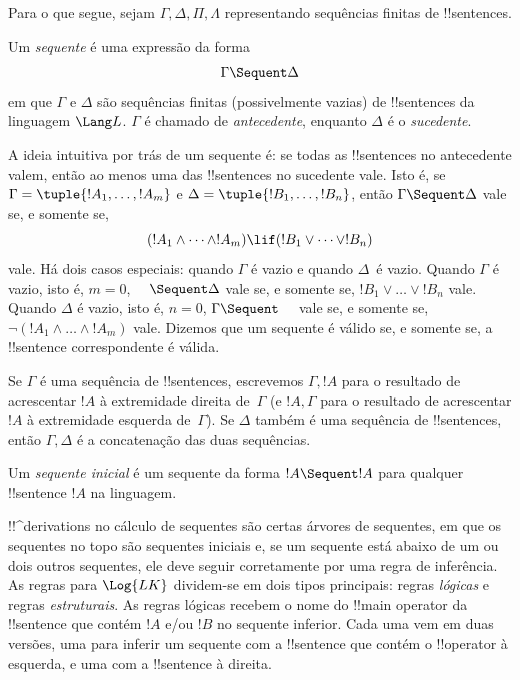\documentclass[../../../include/open-logic-section]{subfiles}
\begin{document}
      {}
      {}


Para o que segue, sejam $\Gamma, \Delta, \Pi, \Lambda$ representando
sequências finitas de !!{sentence}s.

\begin{defn}[Sequente]
Um \emph{sequente} é uma expressão da forma
\[
\Gamma \Sequent \Delta
\]
em que $\Gamma$ e $\Delta$ são sequências finitas (possivelmente vazias) de
!!{sentence}s da linguagem $\Lang L$. $\Gamma$ é chamado de
\emph{antecedente}, enquanto $\Delta$ é o \emph{sucedente}.
\end{defn}

\begin{explain}
A ideia intuitiva por trás de um sequente é: se todas as !!{sentence}s no
antecedente valem, então ao menos uma das !!{sentence}s no
sucedente vale. Isto é, se $\Gamma = \tuple{!A_1, \dots, !A_m}$ e
$\Delta = \tuple{!B_1, \dots, !B_n}$, então $\Gamma \Sequent \Delta$
vale se, e somente se,
\[
(!A_1 \land \cdots \land !A_m) \lif (!B_1 \lor \cdots \lor
!B_n)
\]
vale. Há dois casos especiais: quando $\Gamma$ é vazio e quando
$\Delta$~é vazio. Quando $\Gamma$ é vazio, isto é, $m = 0$, $\quad
\Sequent \Delta$ vale se, e somente se, $!B_1 \lor \dots \lor !B_n$ vale. Quando
$\Delta$ é vazio, isto é, $n = 0$, $\Gamma \Sequent \quad$ vale se, e somente se,
$\lnot(!A_1 \land \dots \land !A_m)$ vale.  Dizemos que um sequente é válido
se, e somente se, a !!{sentence} correspondente é válida.
\end{explain}

Se $\Gamma$ é uma sequência de !!{sentence}s, escrevemos $\Gamma, !A$ para
o resultado de acrescentar $!A$ à extremidade direita de~$\Gamma$ (e $!A,
\Gamma$ para o resultado de acrescentar $!A$ à extremidade esquerda
de~$\Gamma$). Se $\Delta$ também é uma sequência de !!{sentence}s, então $\Gamma,
\Delta$ é a concatenação das duas sequências.

\begin{defn}
Um \emph{sequente inicial} é um sequente
{da forma $!A \Sequent !A$} para qualquer !!{sentence} $!A$ na linguagem.
\end{defn}

!!^{derivation}s no cálculo de sequentes são certas árvores de
sequentes, em que os sequentes no topo são sequentes iniciais e, se um
sequente está abaixo de um ou dois outros sequentes, ele deve seguir
corretamente por uma regra de inferência.  As regras para $\Log{LK}$
dividem-se em dois tipos principais: regras \emph{lógicas} e
regras \emph{estruturais}.  As regras lógicas recebem o nome do !!{main operator}
da !!{sentence} que contém $!A$ e/ou $!B$ no
sequente inferior. Cada uma vem em duas versões, uma para inferir um
sequente com a !!{sentence} que contém o !!{operator} à esquerda,
e uma com a !!{sentence} à direita.
\end{document}
